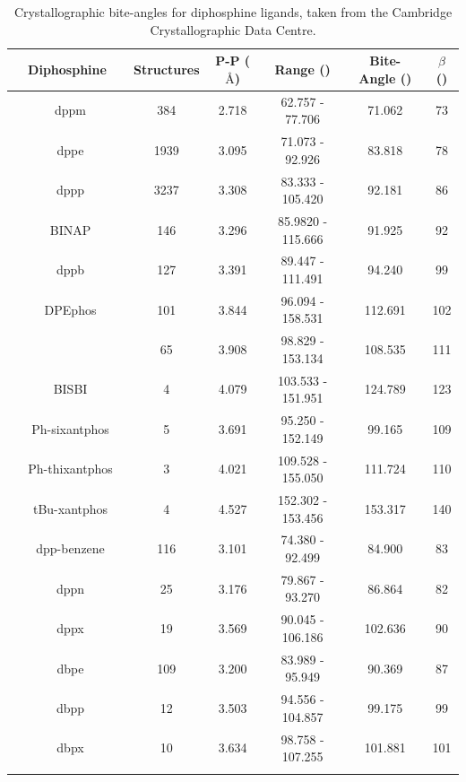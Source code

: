 {\begin{table}[htb]
\small
\caption[Crystallographic bite-angles for diphosphine ligands]{Crystallographic bite-angles for diphosphine ligands, taken from the Cambridge Crystallographic Data Centre.} 
\vspace{1em}
\label{table:biteangles}
\begin{center}
\begin{tabular}{c c c c c c}
	\toprule
	~~\bfseries{Diphosphine}~~ & \bfseries{Structures} & \bfseries{P-P ($\si{\angstrom}$)} & \bfseries{Range (\degrees)} & \bfseries{Bite-Angle (\degrees)} & \bfseries{$\beta$\sub{n} (\degrees)}\\
	\midrule
	 ~dppm			& 384	& 2.718	& 62.757 - 77.706 	& 71.062 	& 73	\\
	 ~dppe			& 1939	& 3.095	& 71.073 - 92.926	& 83.818	& 78 \\
	 ~dppp			& 3237	& 3.308	& 83.333 - 105.420	& 92.181	& 86 \\ 
	~BINAP			& 146	& 3.296	& 85.9820 - 115.666	& 91.925	& 92 \\
	~dppb			& 127	& 3.391	& 89.447 - 111.491	& 94.240	& 99 \\
	 ~DPEphos		& 101	& 3.844	& 96.094 - 158.531	& 112.691	& 102 \\
	 ~\PhXantphos		& 65		& 3.908	& 98.829 - 153.134	& 108.535	& 111 \\
	 ~BISBI			& 4		& 4.079	& 103.533 - 151.951	& 124.789 & 123 \\
	~Ph-sixantphos		& 5		& 3.691 	& 95.250 - 152.149	& 99.165 & 109 \\
	~Ph-thixantphos	& 3		& 4.021	& 109.528 - 155.050	& 111.724	& 110 \\
	~tBu-xantphos		& 4		& 4.527	& 152.302 - 153.456 & 153.317 & 140 \\
	~dpp-benzene		& 116	& 3.101	& 74.380 - 92.499	& 84.900	& 83\\
	~dppn			& 25		& 3.176	& 79.867 - 93.270	& 86.864	& 82 \\
	~dppx			& 19		& 3.569	& 90.045 - 106.186	& 102.636	& 90 \\
	~dbpe			& 109	& 3.200	& 83.989 - 95.949	& 90.369	& 87	\\
	~dbpp			& 12		& 3.503	& 94.556 - 104.857	& 99.175	& 99	\\
	~dbpx			& 10		& 3.634	& 98.758 - 107.255	& 101.881	& 101 \\
	\bottomrule{}
\end{tabular}
\end{center}
\end{table}

}
